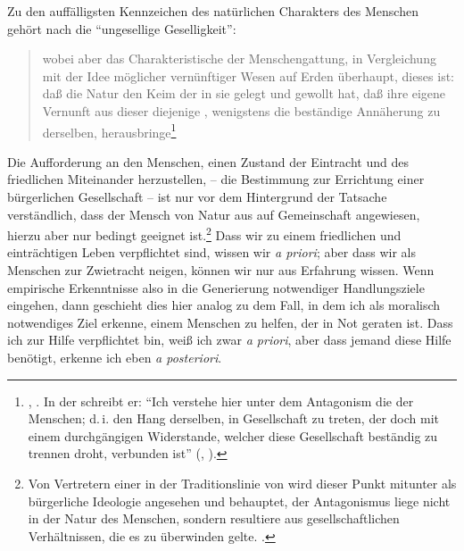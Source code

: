 Zu den auffälligsten Kennzeichen des
natürlichen Charakters des Menschen gehört nach  die
\enquote{ungesellige Geselligkeit}:
\begin{quote}
  \punkt wobei aber das Charakteristische der Menschengattung, in Vergleichung
  mit der Idee möglicher vernünftiger Wesen auf Erden überhaupt, dieses ist: daß die
  Natur den Keim der  in sie gelegt und gewollt hat, daß ihre
  eigene Vernunft aus dieser diejenige , wenigstens die
  beständige Annäherung zu derselben,
  herausbringe\punkt\footnote{\cite[B~313--314]{Kant:AnthropologieinpragmatischerHinsicht1977},
  \cite[VII: 322.3--8]{Kant:GesammelteWerke1900ff.}. In der  schreibt er:
  \enquote{Ich verstehe hier unter dem Antagonism die 
  der Menschen; d.\,i. den Hang derselben, in Gesellschaft zu treten, der doch
  mit einem durchgängigen Widerstande, welcher diese Gesellschaft beständig zu
  trennen droht, verbunden ist}
  \mkbibparens{\cite[][A
  392]{Kant:IdeezueinerallgemeinenGeschichteinweltbuergerlicherAbsicht1977},
  \cite[][VIII: 20.30--33]{Kant:GesammelteWerke1900ff.}}.}
\end{quote}
Die Aufforderung an den Menschen, einen Zustand der Eintracht und des
friedlichen Miteinander herzustellen, -- die Bestimmung zur Errichtung einer
bürgerlichen Gesellschaft --  ist nur vor dem Hintergrund der Tatsache
verständlich, dass der Mensch von Natur aus auf Gemeinschaft angewiesen, hierzu
aber nur bedingt geeignet ist.\footnote{Von Vertretern einer
 in der Traditionslinie von
 wird dieser Punkt mitunter
als bürgerliche Ideologie angesehen und behauptet, der Antagonismus liege nicht
in der Natur des Menschen, sondern resultiere aus gesellschaftlichen
Verhältnissen, die es zu überwinden gelte.
\cite[Vgl.][passim]{Staedtler:KantunddieAporetikmodernerSubjektivitaet2011}.}
Dass wir zu einem friedlichen und einträchtigen Leben verpflichtet sind, wissen
wir \emph{a priori}; aber dass wir als Menschen zur Zwietracht neigen,
können wir nur aus Erfahrung wissen. Wenn empirische Erkenntnisse also in die
Generierung notwendiger Handlungsziele eingehen, dann geschieht dies hier analog
zu dem Fall, in dem ich als moralisch notwendiges Ziel erkenne, einem Menschen
zu helfen, der in Not geraten ist. Dass ich zur Hilfe verpflichtet bin, weiß ich
zwar \emph{a priori}, aber dass jemand diese Hilfe benötigt, erkenne ich eben \emph{a posteriori}.

